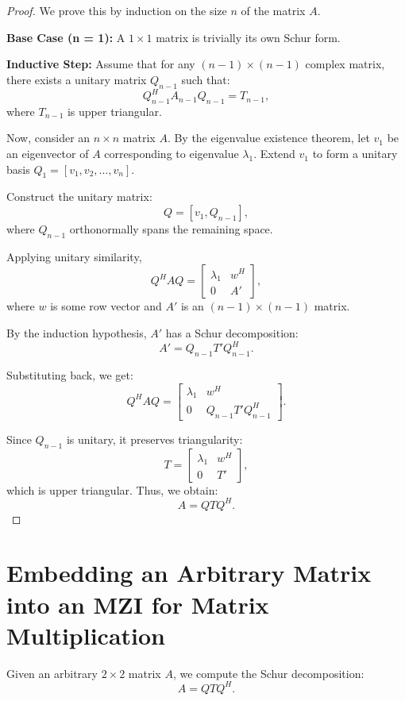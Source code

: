 \documentclass[a4paper,12pt]{article}
\begin{document}
\begin{proof}
    We prove this by induction on the size \( n \) of the matrix \( A \).

    \textbf{Base Case (n = 1):} A \( 1 \times 1 \) matrix is trivially its own Schur form.

    \textbf{Inductive Step:} Assume that for any \( (n-1) \times (n-1) \) complex matrix, there exists a unitary matrix \( Q_{n-1} \) such that:
    \[
    Q_{n-1}^H A_{n-1} Q_{n-1} = T_{n-1},
    \]
    where \( T_{n-1} \) is upper triangular.

    Now, consider an \( n \times n \) matrix \( A \). By the eigenvalue existence theorem, let \( v_1 \) be an eigenvector of \( A \) corresponding to eigenvalue \( \lambda_1 \). Extend \( v_1 \) to form a unitary basis \( Q_1 = [v_1, v_2, \dots, v_n] \).

    Construct the unitary matrix:
    \[
    Q = [v_1, Q_{n-1}],
    \]
    where \( Q_{n-1} \) orthonormally spans the remaining space.

    Applying unitary similarity,
    \[
    Q^H A Q =
    \begin{bmatrix}
        \lambda_1 & w^H \\
        0 & A'
    \end{bmatrix},
    \]
    where \( w \) is some row vector and \( A' \) is an \( (n-1) \times (n-1) \) matrix.

    By the induction hypothesis, \( A' \) has a Schur decomposition:
    \[
    A' = Q_{n-1} T' Q_{n-1}^H.
    \]

    Substituting back, we get:
    \[
    Q^H A Q =
    \begin{bmatrix}
        \lambda_1 & w^H \\
        0 & Q_{n-1} T' Q_{n-1}^H
    \end{bmatrix}.
    \]

    Since \( Q_{n-1} \) is unitary, it preserves triangularity:
    \[
    T =
    \begin{bmatrix}
        \lambda_1 & w^H \\
        0 & T'
    \end{bmatrix},
    \]
    which is upper triangular. Thus, we obtain:
    \[
    A = Q T Q^H.
    \]
\end{proof}



\section{Embedding an Arbitrary Matrix into an MZI for Matrix Multiplication}
Given an arbitrary \( 2 \times 2 \) matrix \( A \), we compute the Schur decomposition:
\begin{equation}
A = Q T Q^H.
\end{equation}
\end{document}
